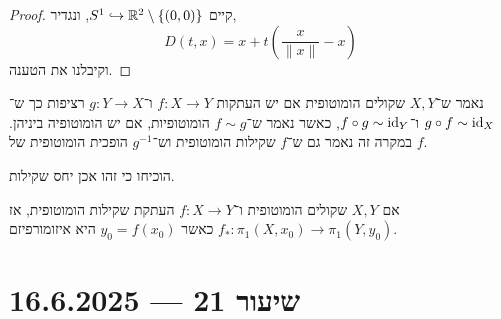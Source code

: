 \begin{proof}
	קיים $S^1 \hookrightarrow \mathbb{R}^2 \setminus \{(0, 0)\}$,
	ונגדיר,
	\[
		D(t, x)
		= x + t(\frac{x}{\lVert x \rVert} - x)
	\]
	וקיבלנו את הטענה.
\end{proof}
\begin{definition}
	נאמר ש־$X, Y$ שקולים הומוטופית אם יש העתקות $f : X \to Y$ ו־$g : Y \to X$ רציפות כך ש־$g \circ f \sim \operatorname{id}_X$ ו־$f \circ g \sim \operatorname{id}_Y$,
	כאשר נאמר ש־$f \sim g$ הומוטופיות, אם יש הומוטופיה ביניהן.
	במקרה זה נאמר גם ש־$f$ שקילות הומוטופית וש־$g^{-1}$ הופכית הומוטופית של $f$.
\end{definition}
\begin{exercise}
	הוכיחו כי זהו אכן יחס שקילות.
\end{exercise}
\begin{theorem}
	אם $X, Y$ שקולים הומוטופית ו־$f : X \to Y$ העתקת שקילות הומוטופית,
	אז $f_* : \pi_1(X, x_0) \to \pi_1(Y, y_0)$ כאשר $y_0 = f(x_0)$ היא איזומורפיזם.
\end{theorem}

\section{שיעור 21 --- 16.6.2025}

